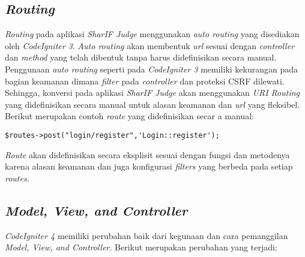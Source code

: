 \subsection{\textit{Routing}}
\textit{Routing} pada aplikasi \textit{SharIF Judge} menggunakan \textit{auto routing} yang disediakan oleh \textit{CodeIgniter 3}. \textit{Auto routing} akan membentuk \textit{url} sesuai dengan \textit{controller} dan \textit{method} yang telah dibentuk tanpa harus didefinisikan secara manual. Penggunaan \textit{auto routing} seperti pada \textit{CodeIgniter 3} memiliki kekurangan pada bagian keamanan dimana \textit{filter} pada \textit{controller} dan proteksi CSRF dilewati. Sehingga, konversi pada aplikasi \textit{SharIF Judge} akan menggunakan \textit{URI Routing} yang didefinisikan secara manual untuk alasan keamanan dan \textit{url} yang fleksibel. Berikut merupakan contoh \textit{route} yang didefinisikan secar a manual:
\begin{center}
\verb|$routes->post("login/register",'Login::register');|
\end{center}
\textit{Route} akan didefinisikan secara eksplisit sesuai dengan fungsi dan metodenya karena alasan keamanan dan juga konfigurasi \textit{filters} yang berbeda pada setiap \textit{routes}.

\subsection{\textit{Model, View, and Controller}}
\textit{CodeIgniter 4} memiliki perubahan baik dari kegunaan dan cara pemanggilan \textit{Model, View, and Controller}. Berikut merupakan perubahan yang terjadi:
